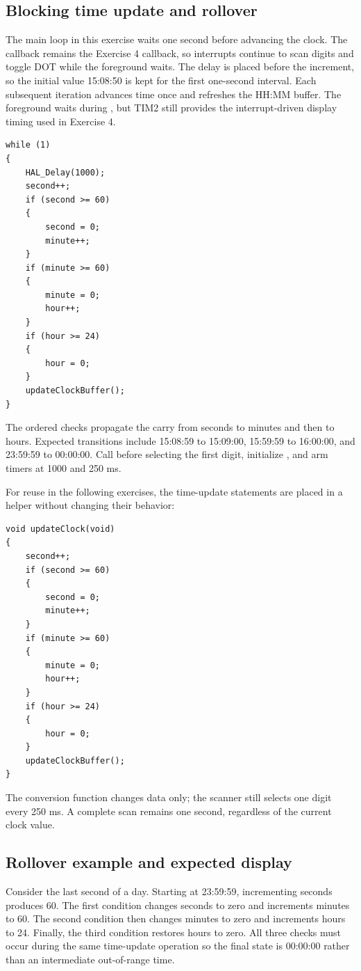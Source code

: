 \documentclass[a4paper]{article}
\newcommand{\code}[1]{\texttt{\detokenize{#1}}}
\newcommand{\topic}[1]{\subsection{#1}}
\begin{document}
\topic{Blocking time update and rollover}
The main loop in this exercise waits one second before advancing the clock.
The callback remains the Exercise 4 callback, so interrupts continue to scan
digits and toggle DOT while the foreground waits.
The delay is placed before the increment, so the initial value 15:08:50 is
kept for the first one-second interval. Each subsequent iteration advances
time once and refreshes the HH:MM buffer. The foreground waits during
\code{HAL_Delay()}, but TIM2 still provides the interrupt-driven display
timing used in Exercise 4.
\par\noindent\begin{minipage}{\linewidth}
\begin{lstlisting}[caption={Exercise 5 main loop}]
while (1)
{
    HAL_Delay(1000);
    second++;
    if (second >= 60)
    {
        second = 0;
        minute++;
    }
    if (minute >= 60)
    {
        minute = 0;
        hour++;
    }
    if (hour >= 24)
    {
        hour = 0;
    }
    updateClockBuffer();
}
\end{lstlisting}
\end{minipage}\par
The ordered checks propagate the carry from seconds to minutes and then to
hours. Expected transitions include 15:08:59 to 15:09:00, 15:59:59 to 16:00:00,
and 23:59:59 to 00:00:00. Call \code{updateClockBuffer()} before selecting the
first digit, initialize \code{index_led = 1}, and arm timers at 1000 and 250 ms.

For reuse in the following exercises, the time-update statements are placed
in a helper without changing their behavior:
\par\noindent\begin{minipage}{\linewidth}
\begin{lstlisting}[caption={Reusable one-second clock update}]
void updateClock(void)
{
    second++;
    if (second >= 60)
    {
        second = 0;
        minute++;
    }
    if (minute >= 60)
    {
        minute = 0;
        hour++;
    }
    if (hour >= 24)
    {
        hour = 0;
    }
    updateClockBuffer();
}
\end{lstlisting}
\end{minipage}\par
The conversion function changes data only; the scanner still selects one
digit every 250 ms. A complete scan remains one second, regardless of the
current clock value.

\topic{Rollover example and expected display}
Consider the last second of a day. Starting at 23:59:59, incrementing seconds
produces 60. The first condition changes seconds to zero and increments minutes
to 60. The second condition then changes minutes to zero and increments hours
to 24. Finally, the third condition restores hours to zero. All three checks
must occur during the same time-update operation so the final state is
00:00:00 rather than an intermediate out-of-range time.
\end{document}
